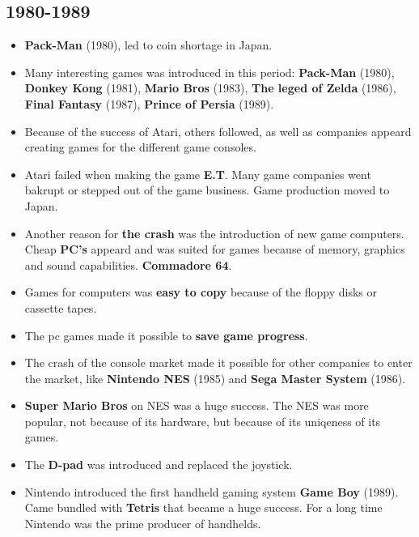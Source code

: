   \subsection*{1980-1989}
    \begin{itemize}
      \item {\bf Pack-Man} (1980), led to coin shortage in Japan.
      \item Many interesting games was introduced in this period: {\bf Pack-Man} (1980), {\bf Donkey Kong} (1981), {\bf Mario Bros} (1983), {\bf The leged of Zelda} (1986), {\bf Final Fantasy} (1987), {\bf Prince of Persia} (1989).
      \item Because of the success of Atari, others followed, as well as companies appeard creating games for the different game consoles. 
      \item Atari failed when making the game {\bf E.T}. Many game companies went bakrupt or stepped out of the game business. Game production moved to Japan. 
      \item Another reason for {\bf the crash} was the introduction of new game computers. Cheap {\bf PC's} appeard and was suited for games because of memory, graphics and sound capabilities. {\bf Commadore 64}.
      \item Games for computers was {\bf easy to copy} because of the floppy disks or cassette tapes. 
      \item The pc games made it possible to {\bf save game progress}. 
      \item The crash of the console market made it possible for other companies to enter the market, like {\bf Nintendo NES} (1985) and {\bf Sega Master System} (1986).
      \item {\bf Super Mario Bros} on NES was a huge success. The NES was more popular, not because of its hardware, but because of its uniqeness of its games. 
      \item The {\bf D-pad} was introduced and replaced the joystick. 
      \item Nintendo introduced the first handheld gaming system {\bf Game Boy} (1989). Came bundled with {\bf Tetris} that became a huge success. For a long time Nintendo was the prime producer of handhelds. 
    \end{itemize}

